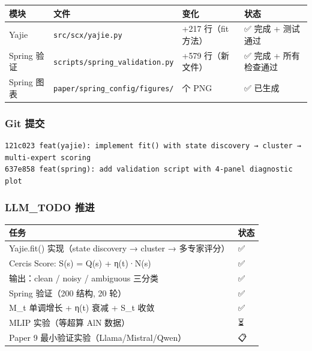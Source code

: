 \documentclass[
  12pt,
]{ctexart}
\begin{document}
\begin{longtable}[]{@{}
  >{\raggedright\arraybackslash}p{}
  >{\raggedright\arraybackslash}p{}
  >{\raggedright\arraybackslash}p{}
  >{\raggedright\arraybackslash}p{}@{}}
\toprule\noalign{}
\begin{minipage}[b]{\linewidth}\raggedright
模块
\end{minipage} & \begin{minipage}[b]{\linewidth}\raggedright
文件
\end{minipage} & \begin{minipage}[b]{\linewidth}\raggedright
变化
\end{minipage} & \begin{minipage}[b]{\linewidth}\raggedright
状态
\end{minipage} \\
\midrule\noalign{}
\endhead
\bottomrule\noalign{}
\endlastfoot
Yajie & \texttt{src/scx/yajie.py} & +217 行（fit 方法） & ✅ 完成 +
测试通过 \\
Spring 验证 & \texttt{scripts/spring\_validation.py} & +579 行（新文件）
& ✅ 完成 + 所有检查通过 \\
Spring 图表 & \texttt{paper/spring\_config/figures/} & 5 个 PNG & ✅
已生成 \\
\end{longtable}

\subsubsection{Git 提交}\label{git-ux63d0ux4ea4}

\begin{verbatim}
121c023 feat(yajie): implement fit() with state discovery → cluster → multi-expert scoring
637e858 feat(spring): add validation script with 4-panel diagnostic plot
\end{verbatim}

\subsubsection{LLM\_TODO 推进}\label{llm_todo-ux63a8ux8fdb}

\begin{longtable}[]{@{}ll@{}}
\toprule\noalign{}
任务 & 状态 \\
\midrule\noalign{}
\endhead
\bottomrule\noalign{}
\endlastfoot
Yajie.fit() 实现（state discovery → cluster → 多专家评分） & ✅ \\
Cercis Score: S(s) = Q(s) + η(t)·N(s) & ✅ \\
输出：clean / noisy / ambiguous 三分类 & ✅ \\
Spring 验证（200 结构, 20 轮） & ✅ \\
M\_t 单调增长 + η(t) 衰减 + S\_t 收敛 & ✅ \\
MLIP 实验（等超算 AlN 数据） & ⏳ \\
Paper 9 最小验证实验（Llama/Mistral/Qwen） & 📋 \\
\end{longtable}
\end{document}
